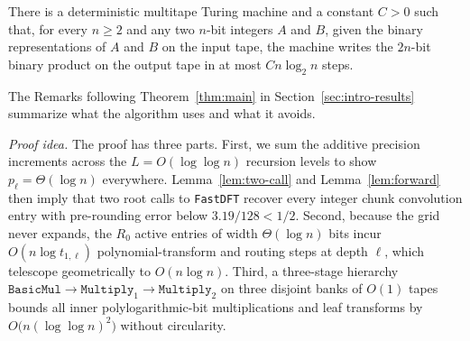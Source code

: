 \begin{thmmainrestated}
There is a deterministic multitape Turing machine and a constant $C > 0$ such that, for every $n \ge 2$ and any two $n$-bit integers $A$ and $B$, given the binary representations of $A$ and $B$ on the input tape, the machine writes the $2n$-bit binary product on the output tape in at most $C n \log_2 n$ steps.
\end{thmmainrestated}

The Remarks following Theorem~\ref{thm:main} in Section~\ref{sec:intro-results} summarize what the algorithm uses and what it avoids.

\medskip\noindent\emph{Proof idea.} The proof has three parts. First, we sum the additive precision increments across the $L = O(\log \log n)$ recursion levels to show $p_\ell = \Theta(\log n)$ everywhere. Lemma~\ref{lem:two-call} and Lemma~\ref{lem:forward} then imply that two root calls to \texttt{FastDFT} recover every integer chunk convolution entry with pre-rounding error below $3.19 / 128 < 1/2$. Second, because the grid never expands, the $R_0$ active entries of width $\Theta(\log n)$ bits incur $O(n \log t_{1,\ell})$ polynomial-transform and routing steps at depth $\ell$, which telescope geometrically to $O(n \log n)$. Third, a three-stage hierarchy $\texttt{BasicMul} \to \texttt{Multiply}_1 \to \texttt{Multiply}_2$ on three disjoint banks of $O(1)$ tapes bounds all inner polylogarithmic-bit multiplications and leaf transforms by $O\bigl(n (\log \log n)^2\bigr)$ without circularity.

